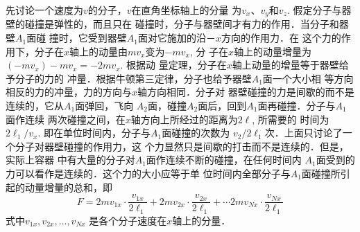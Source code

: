 先讨论一个速度为$v$的分子，$v$在直角坐标轴上的分量
为$v_x$、$v_y$和$v_z$. 假定分子与器壁的碰撞是弹性的，而且只在
碰撞时，分子与器壁间才有力的作用．当分子和器壁$A_1$面碰
撞时，它受到器壁$A_1$面对它施加的沿－$x$方向的作用力．在
这个力的作用下，分子在$x$轴上的动量由$mv_x$变为$-mv_x$, 分
子在$x$轴上的动量增量为$(-mv_x)-mv_x=-2mv_x$. 根据动
量定理，分子在$x$轴上动量的增量等于器壁给予分子的力的
冲量．根据牛顿第三定律，分子也给予器壁$A_1$面一个大小相
等方向相反的力的冲量，力的方向与$x$轴方向相同．分子对
器壁碰撞的力是间歇的而不是连续的，它从$A_1$面弹回，飞向
$A_2$面，碰撞$A_2$面后，回到$A_1$面再碰撞．分子与$A_1$面作连续
两次碰撞之间，在$x$轴方向上所经过的距离为$2\ell$, 所需要的
时间为$2\ell_1/v_x$. 即在单位时间内，分子与$A_1$面碰撞的次数为
$v_2/2\ell_1$次．上面只讨论了一个分子对器壁碰撞的作用力，这
个力显然只是间歇的打击而不是连续的．但是，实际上容器
中有大量的分子对$A_1$面作连续不断的碰撞，在任何时间内
$A_1$面受到的力可以看作是连续的．这个力的大小应等于单
位时间内全部分子与$A_1$面碰撞所引起的动量增量的总和，即
\[F=2mv_{1x}\cdot \frac{v_{1x}}{2\ell_1}+2mv_{2x}\cdot \frac{v_{2x}}{2\ell_1}+\cdots 2mv_{Nx}\cdot \frac{v_{Nx}}{2\ell_1}\]
式中$v_{1x},v_{2x},\ldots,v_{Nx}$
是各个分子速度在$x$轴上的分量．


